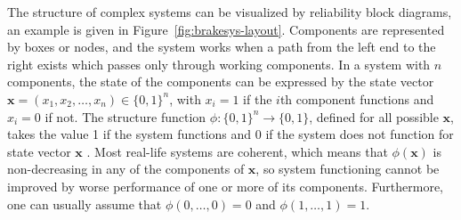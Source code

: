 \documentclass[Journal,SectionNumbers,InsideFigs]{ascelike}
\renewcommand{\vec}[1]{{\bm#1}}
\begin{document}
The structure of complex systems can be visualized by reliability block diagrams,
an example is given in Figure~\ref{fig:brakesys-layout}.
Components are represented by boxes or nodes,
and the system works when a path from the left end to the right exists
which passes only through working components.
In a system with $n$ components, the state of the components can be expressed by the state vector
$\vec{x} = (x_1,x_2,\ldots,x_n) \in \{0,1\}^n$, with $x_i=1$ if the $i$th component functions 
and $x_i=0$ if not.
The structure function $\phi : \{0,1\}^n \rightarrow \{0,1\}$, defined for all possible $\vec{x}$, takes 
the value 1 if the system functions and 0 if the system does not function for state vector $\vec{x}$
\cite{BP75}.
Most real-life systems are coherent,
which means that $\phi(\vec{x})$ is non-decreasing in any of the components of $\vec{x}$,
so system functioning cannot be improved by worse performance of one or more of its components.
Furthermore, one can usually assume that $\phi(0, \ldots, 0) = 0$ and $\phi(1, \ldots, 1) = 1$.
\end{document}
